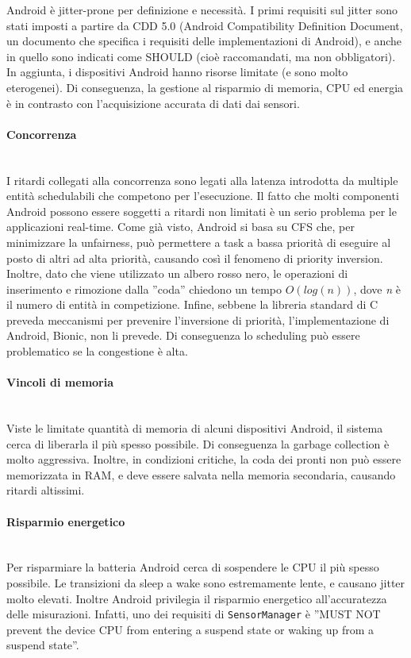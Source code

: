 Android è jitter-prone per definizione e necessità. I primi requisiti sul jitter sono stati imposti a partire da CDD 5.0 (Android Compatibility Definition Document, un documento che specifica i requisiti delle implementazioni di Android), e anche in quello sono indicati come SHOULD (cioè raccomandati, ma non obbligatori). In aggiunta, i dispositivi Android hanno risorse limitate (e sono molto eterogenei). Di conseguenza, la gestione al risparmio di memoria, CPU ed energia è in contrasto con l'acquisizione accurata di dati dai sensori.

\paragraph{Concorrenza} \mbox{} \\
I ritardi collegati alla concorrenza sono legati alla latenza introdotta da multiple entità schedulabili che competono per l'esecuzione. Il fatto che molti componenti Android possono essere soggetti a ritardi non limitati è un serio problema per le applicazioni real-time. Come già visto, Android si basa su CFS che, per minimizzare la unfairness, può permettere a task a bassa priorità di eseguire al posto di altri ad alta priorità, causando così il fenomeno di priority inversion. Inoltre, dato che viene utilizzato un albero rosso nero, le operazioni di inserimento e rimozione dalla ''coda'' chiedono un tempo $O(log(n))$, dove \textit{n} è il numero di entità in competizione. Infine, sebbene la libreria standard di C preveda meccanismi per prevenire l'inversione di priorità, l'implementazione di Android, Bionic, non li prevede. Di conseguenza lo scheduling può essere problematico se la congestione è alta.

\paragraph{Vincoli di memoria} \mbox{} \\
Viste le limitate quantità di memoria di alcuni dispositivi Android, il sistema cerca di liberarla il più spesso possibile. Di conseguenza la garbage collection è molto aggressiva. Inoltre, in condizioni critiche, la coda dei pronti non può essere memorizzata in RAM, e deve essere salvata nella memoria secondaria, causando ritardi altissimi.

\paragraph{Risparmio energetico} \mbox{} \\
Per risparmiare la batteria Android cerca di sospendere le CPU il più spesso possibile. Le transizioni da sleep a wake sono estremamente lente, e causano jitter molto elevati. Inoltre Android privilegia il risparmio energetico all'accuratezza delle misurazioni. Infatti, uno dei requisiti di \texttt{SensorManager} è ''MUST NOT prevent the device CPU from entering a suspend state or waking up from a suspend state''.